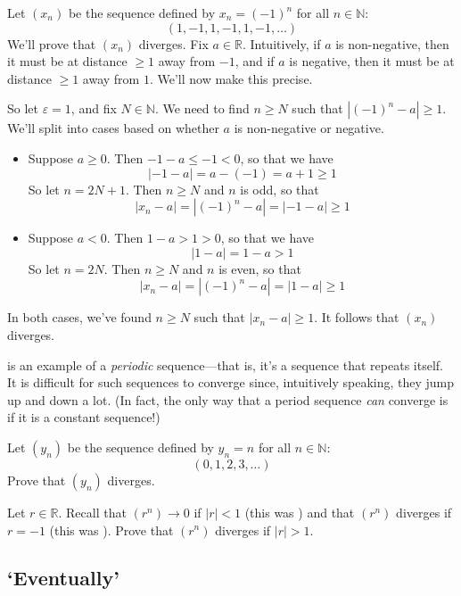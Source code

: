 \begin{example}
\label{exSequencePlusMinusOneDiverges}
Let $(x_n)$ be the sequence defined by $x_n=(-1)^n$ for all $n \in \mathbb{N}$:
\[ (1,-1,1,-1,1,-1,\dots) \]
We'll prove that $(x_n)$ diverges. Fix $a \in \mathbb{R}$. Intuitively, if $a$ is non-negative, then it must be at distance $\ge 1$ away from $-1$, and if $a$ is negative, then it must be at distance $\ge 1$ away from $1$. We'll now make this precise.

So let $\varepsilon = 1$, and fix $N \in \mathbb{N}$. We need to find $n \ge N$ such that $|({-1})^n-a| \ge 1$. We'll split into cases based on whether $a$ is non-negative or negative.
\begin{itemize}
\item Suppose $a \ge 0$. Then ${-1}-a \le -1 < 0$, so that we have
\[ |{-1}-a| = a-(-1) = a+1 \ge 1 \]
So let $n=2N+1$. Then $n \ge N$ and $n$ is odd, so that
\[ |x_n-a|=|({-1})^n-a|=|{-1}-a| \ge 1 \]
\item Suppose $a<0$. Then $1-a > 1 > 0$, so that we have
\[ |1-a| = 1-a > 1 \]
So let $n=2N$. Then $n \ge N$ and $n$ is even, so that
\[ |x_n-a| = |({-1})^n-a|=|1-a| \ge 1 \]
\end{itemize}
In both cases, we've found $n \ge N$ such that $|x_n-a| \ge 1$. It follows that $(x_n)$ diverges.
\end{example}

 is an example of a \textit{periodic} sequence---that is, it's a sequence that repeats itself. It is difficult for such sequences to converge since, intuitively speaking, they jump up and down a lot. (In fact, the only way that a period sequence \textit{can} converge is if it is a constant sequence!)

\begin{exercise}
Let $(y_n)$ be the sequence defined by $y_n=n$ for all $n \in \mathbb{N}$:
\[ (0,1,2,3,\dots) \]
Prove that $(y_n)$ diverges.
\end{exercise}

\begin{exercise}
Let $r \in \mathbb{R}$. Recall that $(r^n) \to 0$ if $|r|<1$ (this was ) and that $(r^n)$ diverges if $r=-1$ (this was ). Prove that $(r^n)$ diverges if $|r|>1$.
\end{exercise}

\subsection*{`Eventually'}

